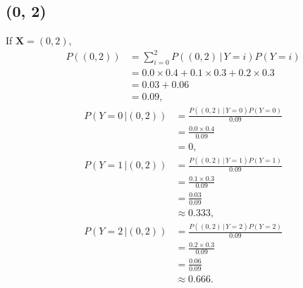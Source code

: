 \documentclass[10pt]{article}
\begin{document}
\subsection*{(0, 2)}
If $\textbf{X} = (0,2)$, 
\begin{align*}
P((0, 2)) &= \sum_{i = 0}^2 P((0, 2) \, | \, Y = i)P(Y = i) \\
             &= 0.0 \times 0.4 + 0.1 \times 0.3 + 0.2 \times 0.3 \\
             &= 0.03 + 0.06 \\
             &= 0.09,
\end{align*}
\begin{align*}
P(Y = 0 \, | (0,2)) &= \frac{P((0, 2) \, | \, Y = 0)P(Y = 0)}{ 0.09 } \\
                           &= \frac{0.0 \times 0.4}{ 0.09 } \\
                           &= 0,
\end{align*}
\begin{align*}
P(Y = 1 \, | (0,2)) &= \frac{P((0, 2) \, | \, Y = 1)P(Y = 1)}{ 0.09 } \\
                           &= \frac{0.1 \times 0.3}{ 0.09 } \\
                           &= \frac{ 0.03 }{ 0.09 } \\
                           &\approx 0.333,
\end{align*}
\begin{align*}
P(Y = 2 \, | (0,2)) &= \frac{P((0, 2) \, | \, Y = 2)P(Y = 2)}{ 0.09 } \\
                           &= \frac{ 0.2 \times 0.3 }{ 0.09 } \\
                           &= \frac{ 0.06 }{ 0.09 } \\
                           &\approx 0.666.
\end{align*}
\end{document}
